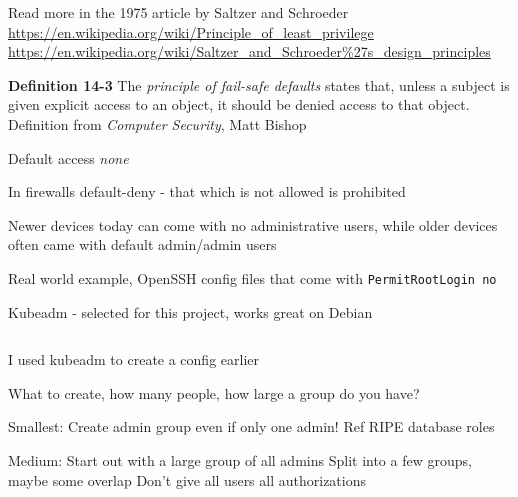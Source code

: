 \documentclass[Screen16to9,17pt]{foils}
\begin{document}
Read more in the 1975 article by Saltzer and Schroeder\\
\url{https://en.wikipedia.org/wiki/Principle_of_least_privilege}\\
\url{https://en.wikipedia.org/wiki/Saltzer_and_Schroeder%27s_design_principles}


\begin{list1}
\item {\bf Definition 14-3} The \emph{principle of fail-safe defaults} states that, unless a subject is given explicit access to an object, it should be denied access to that object.\\
Definition from \emph{Computer Security}, Matt Bishop
\item Default access \emph{none}
\item In firewalls default-deny - that which is not allowed is prohibited
\item Newer devices today can come with no administrative users, while older devices often came with default admin/admin users
\item Real world example, OpenSSH config files that come with \verb+PermitRootLogin no+
\end{list1}


Kubeadm - selected for this project, works great on Debian



\begin{verbatim}

\end{verbatim}

\begin{list2}
\item I used kubeadm to create a config earlier
\end{list2}


\begin{list2}
\item
\end{list2}
What to create, how many people, how large a group do you have?

Smallest:
Create admin group even if only one admin! Ref RIPE database roles

Medium:
Start out with a large group of all admins
Split into a few groups, maybe some overlap
Don't give all users all authorizations
\end{document}
